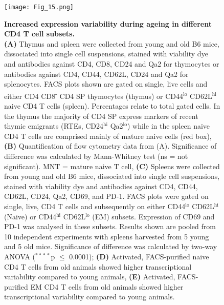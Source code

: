 \begin{figure}[!ht]
\centering
\texttt{[image: Fig\_15.png]}
\caption[Increased expression variability during ageing in different CD4\plus{} T cell subsets]{\textbf{Increased expression variability during ageing in different CD4\plus{} T cell subsets.} \\
\textbf{(A)} Thymus and spleen were collected from young and old B6 mice, dissociated into single cell suspensions, stained with viability dye and antibodies against CD4, CD8, CD24 and Qa2 for thymocytes or antibodies against CD4, CD44, CD62L, CD24 and Qa2 for splenocytes. FACS plots shown are gated on single, live cells and either CD4\plus{} CD8\textsuperscript{-} CD4 \gls{SP} thymocytes (thymus) or CD44$^\text{lo}$ CD62L$^\text{hi}$ naive CD4\plus{} T cells (spleen). Percentages relate to total gated cells. In the thymus the majority of CD4 SP express markers of recent thymic emigrants (RTEs, CD24$^\text{hi}$ Qa2$^\text{lo}$) while in the spleen naive CD4\plus{} T cells are comprised mainly of mature naive cells (red box), \textbf{(B)} Quantification of flow cytometry data from (A). Significance of difference was calculated by Mann-Whitney test (ns = not significant). MNT = mature naive T cell, \textbf{(C)} Spleens were collected from young and old B6 mice, dissociated into single cell suspensions, stained with viability dye and antibodies against CD4, CD44, CD62L, CD24, Qa2, CD69, and PD-1. FACS plots were gated on single, live, CD4\plus{} T cells and subsequently on either CD44$^\text{lo}$ CD62L$^\text{hi}$ (Naive) or CD44$^\text{hi}$ CD62L$^\text{lo}$ (EM) subsets. Expression of CD69 and PD-1 was analysed in these subsets. Results shown are pooled from 10 independent experiments with spleens harvested from 5 young and 5 old mice. Significance of difference was calculated by two-way ANOVA ($^{\ast{}\ast{}\ast{}\ast}$p $\leq$ 0.0001); \textbf{(D)} Activated, FACS-purified naive CD4\plus{} T cells from old animals showed higher transcriptional variability compared to young animals, \textbf{(E)} Activated, FACS-purified EM CD4\plus{} T cells from old animals showed higher transcriptional variability compared to young animals.}
\label{fig1:EM_Naive_CD4}
\end{figure}

